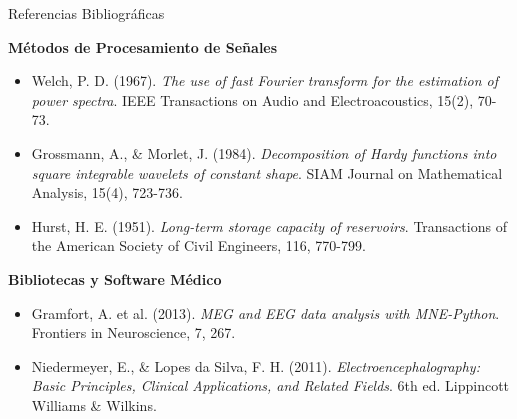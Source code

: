 \documentclass[10pt, aspectratio=169]{beamer} %
\begin{document}
\begin{frame}[allowframebreaks]{Referencias Bibliográficas}
    \framebreak %
    
    \textbf{Métodos de Procesamiento de Señales}
    \begin{itemize}
        \item Welch, P. D. (1967). \textit{The use of fast Fourier transform for the estimation of power spectra}. IEEE Transactions on Audio and Electroacoustics, 15(2), 70-73.
        \item Grossmann, A., \& Morlet, J. (1984). \textit{Decomposition of Hardy functions into square integrable wavelets of constant shape}. SIAM Journal on Mathematical Analysis, 15(4), 723-736.
        \item Hurst, H. E. (1951). \textit{Long-term storage capacity of reservoirs}. Transactions of the American Society of Civil Engineers, 116, 770-799.
    \end{itemize}

    \vspace{0.3cm}
    \textbf{Bibliotecas y Software Médico}
    \begin{itemize}
        \item Gramfort, A. et al. (2013). \textit{MEG and EEG data analysis with MNE-Python}. Frontiers in Neuroscience, 7, 267.
        \item Niedermeyer, E., \& Lopes da Silva, F. H. (2011). \textit{Electroencephalography: Basic Principles, Clinical Applications, and Related Fields}. 6th ed. Lippincott Williams \& Wilkins.
    \end{itemize}
\end{frame}
\end{document}
